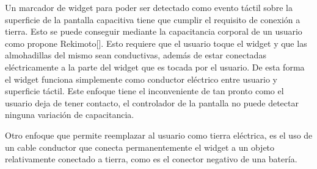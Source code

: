 Un marcador de widget para poder ser detectado como evento táctil sobre la superficie de la pantalla capacitiva tiene que cumplir el requisito de conexión a tierra. Esto se puede conseguir mediante la capacitancia corporal de un usuario como propone Rekimoto[]. Esto requiere que el usuario toque el widget y que las almohadillas del mismo sean conductivas, además de estar conectadas eléctricamente a la parte del widget que es tocada por el usuario. De esta forma el widget funciona simplemente como conductor eléctrico entre usuario y superficie táctil. Este enfoque tiene el inconveniente de tan pronto como el usuario deja de tener contacto, el controlador de la pantalla no puede detectar ninguna variación de capacitancia.

Otro enfoque que permite reemplazar al usuario como tierra eléctrica, es el uso de un cable conductor que conecta permanentemente el widget a un objeto relativamente conectado a tierra, como es el conector negativo de una batería.
